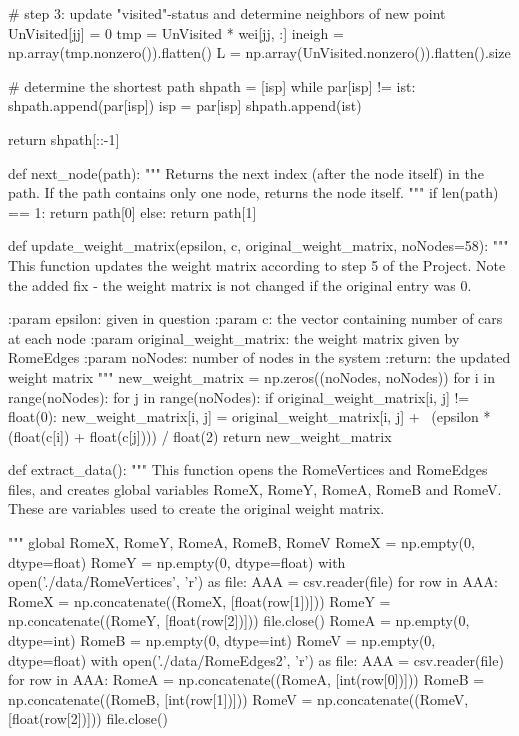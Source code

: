 \documentclass[paper=a4, fontsize=12pt]{scrartcl} %
\numberwithin{equation}{section}       %
\numberwithin{figure}{section}         %
\numberwithin{table}{section}          %
\begin{document}
\begin{python}
        # step 3: update "visited"-status and determine neighbors of new point
        UnVisited[jj] = 0
        tmp = UnVisited * wei[jj, :]
        ineigh = np.array(tmp.nonzero()).flatten()
        L = np.array(UnVisited.nonzero()).flatten().size

    # determine the shortest path
    shpath = [isp]
    while par[isp] != ist:
        shpath.append(par[isp])
        isp = par[isp]
    shpath.append(ist)

    return shpath[::-1]

def next_node(path):
    """ Returns the next index (after the node itself) in the path.
        If the path contains only one node, returns the node itself.
    """
    if len(path) == 1:
        return path[0]
    else:
        return path[1]


def update_weight_matrix(epsilon, c, original_weight_matrix, noNodes=58):
    """
    This function updates the weight matrix according to step 5 of the
    Project. Note the added fix - the weight matrix is not changed if
    the original entry was 0.



    :param epsilon: given in question
    :param c: the vector containing number of cars at each node
    :param original_weight_matrix: the weight matrix given by RomeEdges
    :param noNodes: number of nodes in the system
    :return: the updated weight matrix
    """
    new_weight_matrix = np.zeros((noNodes, noNodes))
    for i in range(noNodes):
        for j in range(noNodes):
            if original_weight_matrix[i, j] != float(0):
                new_weight_matrix[i, j] = original_weight_matrix[i, j] + \
                                          (epsilon * (float(c[i]) +
                                                      float(c[j]))) / float(2)
    return new_weight_matrix


def extract_data():
    """
    This function opens the RomeVertices and RomeEdges files, and creates
    global variables RomeX, RomeY, RomeA, RomeB and RomeV. These are variables
    used to create the original weight matrix.

    """
    global RomeX, RomeY, RomeA, RomeB, RomeV
    RomeX = np.empty(0, dtype=float)
    RomeY = np.empty(0, dtype=float)
    with open('./data/RomeVertices', 'r') as file:
        AAA = csv.reader(file)
        for row in AAA:
            RomeX = np.concatenate((RomeX, [float(row[1])]))
            RomeY = np.concatenate((RomeY, [float(row[2])]))
    file.close()
    RomeA = np.empty(0, dtype=int)
    RomeB = np.empty(0, dtype=int)
    RomeV = np.empty(0, dtype=float)
    with open('./data/RomeEdges2', 'r') as file:
        AAA = csv.reader(file)
        for row in AAA:
            RomeA = np.concatenate((RomeA, [int(row[0])]))
            RomeB = np.concatenate((RomeB, [int(row[1])]))
            RomeV = np.concatenate((RomeV, [float(row[2])]))
    file.close()
\end{python}
\end{document}

